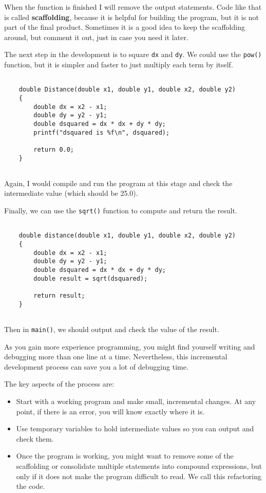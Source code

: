 
When the function is finished I will remove the output statements.  Code
like that is called {\bf scaffolding}, because it is helpful for
building the program, but it is not part of the final product.
Sometimes it is a good idea to keep the scaffolding around, but
comment it out, just in case you need it later.

The next step in the development is to square {\tt dx} and {\tt dy}.
We could use the {\tt pow()} function, but it is simpler and
faster to just multiply each term by itself.

\begin{verbatim}

    double Distance(double x1, double y1, double x2, double y2)
    {
        double dx = x2 - x1;
        double dy = y2 - y1;
        double dsquared = dx * dx + dy * dy;
        printf("dsquared is %f\n", dsquared);
        
        return 0.0;
    }
    
\end{verbatim}
%
Again, I would compile and run the program at this stage
and check the intermediate value (which should be 25.0).

Finally, we can use the {\tt sqrt()} function to compute and
return the result.

\begin{verbatim}

    double distance(double x1, double y1, double x2, double y2) 
    {
        double dx = x2 - x1;
        double dy = y2 - y1;
        double dsquared = dx * dx + dy * dy;
        double result = sqrt(dsquared);
        
        return result;
    }
    
\end{verbatim}
%
Then in {\tt main()}, we should output and check the value of the result.

As you gain more experience programming, you might find yourself
writing and debugging more than one line at a time.  Nevertheless,
this incremental development process can save you a lot of
debugging time.

The key aspects of the process are:

\begin{itemize}

\item Start with a working program and make small, incremental
changes.  At any point, if there is an error, you will know
exactly where it is.

\item Use temporary variables to hold intermediate values so
you can output and check them.

\item Once the program is working, you might want to remove
some of the scaffolding or consolidate multiple statements into
compound expressions, but only if it does not make the program
difficult to read. We call this refactoring the code.

\end{itemize}

